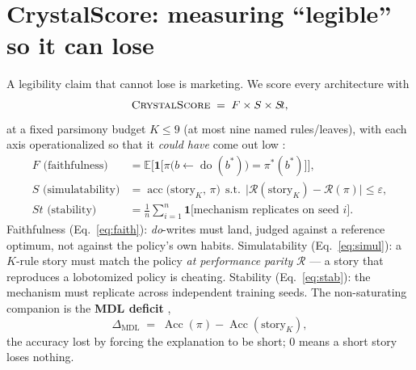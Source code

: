 \documentclass[11pt]{article}
\newcommand{\E}{\mathbb{E}}
\newcommand{\ind}{\mathbf{1}}
\begin{document}
\section{CrystalScore: measuring ``legible'' so it can lose}
\label{sec:metrics}

A legibility claim that cannot lose is marketing. We score every architecture with
\begin{equation}
\textsc{CrystalScore} \;=\; F \times S \times S\!t,
\label{eq:cs}
\end{equation}
at a fixed parsimony budget $K \le 9$ (at most nine named rules/leaves), with each axis
operationalized so that it \emph{could have} come out low
\citep{doshivelez2017,jacovi2020,lipton2018}:
\begin{align}
F \text{ (faithfulness)} &= \E\Big[\ind\big[\pi\big(b \leftarrow \operatorname{do}(b^{*})\big)
= \pi^{*}(b^{*})\big]\Big],
\label{eq:faith}\\[3pt]
S \text{ (simulatability)} &= \operatorname{acc}\big(\text{story}_{K},\, \pi\big)
\ \ \text{s.t.}\ \ \big|\mathcal{R}(\text{story}_K) - \mathcal{R}(\pi)\big| \le \varepsilon,
\label{eq:simul}\\[3pt]
S\!t \text{ (stability)} &= \frac{1}{n}\sum_{i=1}^{n}
\ind\big[\text{mechanism replicates on seed } i\big].
\label{eq:stab}
\end{align}
Faithfulness (Eq.~\ref{eq:faith}): \emph{do}-writes must land, judged against a reference
optimum, not against the policy's own habits. Simulatability (Eq.~\ref{eq:simul}): a $K$-rule
story must match the policy \emph{at performance parity} $\mathcal{R}$ --- a story that
reproduces a lobotomized policy is cheating. Stability (Eq.~\ref{eq:stab}): the mechanism must
replicate across independent training seeds. The non-saturating companion is the \textbf{MDL
deficit} \citep{rissanen1978},
\begin{equation}
\Delta_{\text{MDL}} \;=\; \operatorname{Acc}(\pi) - \operatorname{Acc}(\text{story}_{K}),
\label{eq:mdl}
\end{equation}
the accuracy lost by forcing the explanation to be short; $0$ means a short story loses
nothing.
\end{document}
